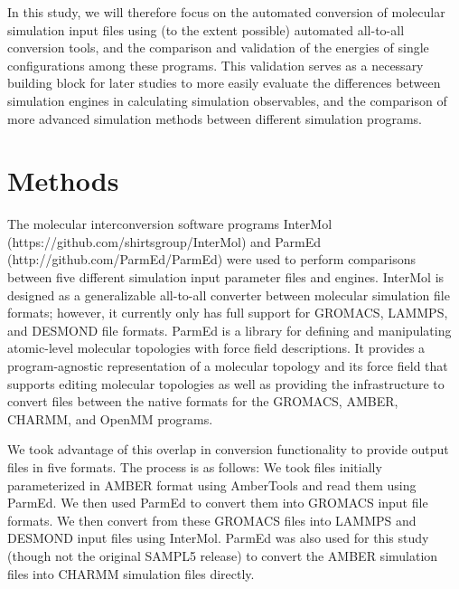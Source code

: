 In this study, we will therefore focus on the automated conversion of
molecular simulation input files using (to the extent possible)
automated all-to-all conversion tools, and the comparison and
validation of the energies of single configurations among these
programs.  This validation serves as a necessary building block for
later studies to more easily evaluate the differences between
simulation engines in calculating simulation observables, and the
comparison of more advanced simulation methods between different
simulation programs.

\section*{Methods}
\begin{sloppypar}
The molecular interconversion software programs InterMol
(https://github.com/shirtsgroup/InterMol) and ParmEd
(http://github.com/ParmEd/ParmEd) were used to perform comparisons
between five different simulation input parameter files and engines.
InterMol is designed as a generalizable all-to-all converter between
molecular simulation file formats; however, it currently only has full
support for GROMACS, LAMMPS, and DESMOND file formats.  ParmEd is
a library for defining and manipulating atomic-level molecular topologies with
force field descriptions. It provides a program-agnostic representation of a
molecular topology and its force field that supports editing molecular
topologies as well as providing the infrastructure to convert files between the
native formats for the GROMACS, AMBER, CHARMM, and OpenMM programs.
\end{sloppypar}

We took advantage of this overlap in conversion functionality to
provide output files in five formats. The process is as follows: We
took files initially parameterized in AMBER format using AmberTools
and read them using ParmEd. We then used ParmEd to convert them into
GROMACS input file formats. We then convert from these GROMACS files
into LAMMPS and DESMOND input files using InterMol.  ParmEd was also
used for this study (though not the original SAMPL5 release) to
convert the AMBER simulation files into CHARMM simulation files
directly.

